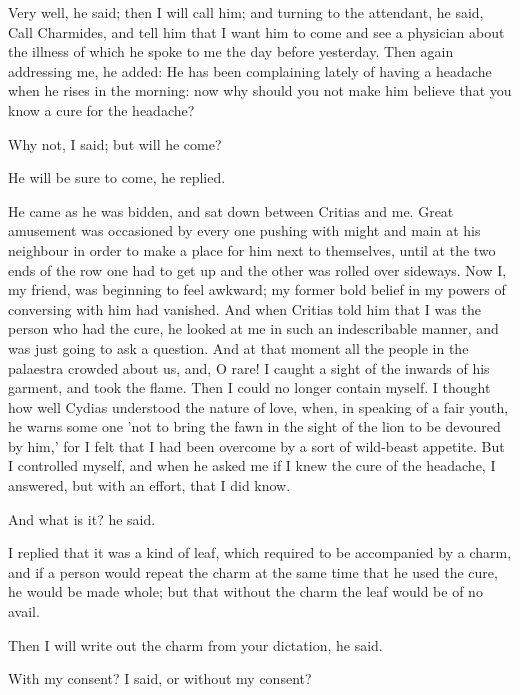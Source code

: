 \documentclass[11pt,letter]{article}
\begin{document}
\par  Very well, he said; then I will call him; and turning to the attendant, he said, Call Charmides, and tell him that I want him to come and see a physician about the illness of which he spoke to me the day before yesterday. Then again addressing me, he added: He has been complaining lately of having a headache when he rises in the morning: now why should you not make him believe that you know a cure for the headache?

\par  Why not, I said; but will he come?

\par  He will be sure to come, he replied.

\par  He came as he was bidden, and sat down between Critias and me. Great amusement was occasioned by every one pushing with might and main at his neighbour in order to make a place for him next to themselves, until at the two ends of the row one had to get up and the other was rolled over sideways. Now I, my friend, was beginning to feel awkward; my former bold belief in my powers of conversing with him had vanished. And when Critias told him that I was the person who had the cure, he looked at me in such an indescribable manner, and was just going to ask a question. And at that moment all the people in the palaestra crowded about us, and, O rare! I caught a sight of the inwards of his garment, and took the flame. Then I could no longer contain myself. I thought how well Cydias understood the nature of love, when, in speaking of a fair youth, he warns some one 'not to bring the fawn in the sight of the lion to be devoured by him,' for I felt that I had been overcome by a sort of wild-beast appetite. But I controlled myself, and when he asked me if I knew the cure of the headache, I answered, but with an effort, that I did know.

\par  And what is it? he said.

\par  I replied that it was a kind of leaf, which required to be accompanied by a charm, and if a person would repeat the charm at the same time that he used the cure, he would be made whole; but that without the charm the leaf would be of no avail.

\par  Then I will write out the charm from your dictation, he said.

\par  With my consent? I said, or without my consent?
\end{document}
